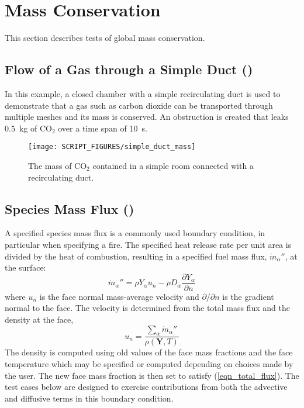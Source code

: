 \documentclass[11pt]{book}
\begin{document}
\section{Mass Conservation}

This section describes tests of global mass conservation.

\subsection{Flow of a Gas through a Simple Duct (\texorpdfstring{}{simple\_duct})}
\label{simple_duct}

In this example, a closed chamber with a simple recirculating duct is used to demonstrate that a gas such as carbon dioxide can be transported
through multiple meshes and its mass is conserved. An obstruction is created that leaks 0.5~kg of CO$_2$ over a time span of 10~s.

\begin{figure}[ht]
\centering
\texttt{[image: SCRIPT\_FIGURES/simple\_duct\_mass]}
\caption[The  test case]{The mass of CO$_2$ contained in a simple room connected with a recirculating duct.}
\label{simple_duct_fig}
\end{figure}


\subsection{Species Mass Flux (\texorpdfstring{}{species\_conservation})}
\label{species_conservation_1}
\label{species_conservation_2}
\label{species_conservation_3}
\label{species_conservation_4}

A specified species mass flux is a commonly used boundary condition, in particular when specifying a fire.  The specified heat release rate per unit area is divided by the heat of combustion, resulting in a specified fuel mass flux, $\dot{m}_\alpha''$, at the surface:
\begin{equation}
\label{eqn_total_flux}
\dot{m}_{\alpha}'' = \rho Y_{\alpha} u_n - \rho D_\alpha \frac{\partial Y_\alpha}{\partial n}
\end{equation}
where $u_n$ is the face normal mass-average velocity and $\partial/\partial n$ is the gradient normal to the face.  The velocity is determined from the total mass flux and the density at the face,
\begin{equation}
\label{eqn_un}
u_n = \frac{\sum_\alpha \dot{m}_\alpha''}{\rho(\mathbf{Y},T)}
\end{equation}
The density is computed using old values of the face mass fractions and the face temperature which may be specified or computed depending on choices made by the user.  The new face mass fraction is then set to satisfy (\ref{eqn_total_flux}).  The test cases below are designed to exercise contributions from both the advective and diffusive terms in this boundary condition.
\end{document}
